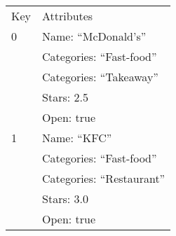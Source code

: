 \begin{tabular}{ |p{2cm}|p{4cm}|}
    \hline
    \rowcolor{Gray}
    \multicolumn{2}{|c|}{Businesses} \\
    \hline
    \rowcolor{LightGray}
    Key & Attributes                 \\
    \hline
    0   & Name: ``McDonald's''       \\
        & Categories: ``Fast-food''  \\
        & Categories: ``Takeaway''   \\
        & Stars: 2.5                 \\
        & Open: true                 \\
    \hline
    1   & Name: ``KFC''              \\
        & Categories: ``Fast-food''  \\
        & Categories: ``Restaurant'' \\
        & Stars: 3.0                 \\
        & Open: true                 \\
    \hline
\end{tabular}
